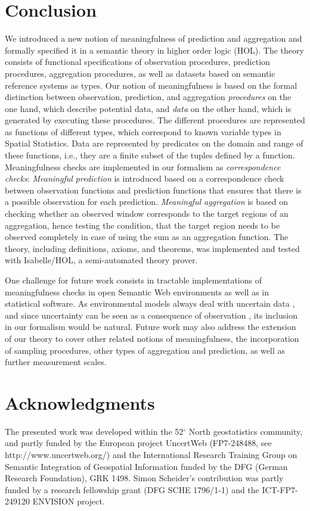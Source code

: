 \documentclass[final,authoryear,1p,times]{elsarticle}
\begin{document}
\section{Conclusion}\label{conclusions}

We introduced a new notion of meaningfulness of prediction and aggregation and formally specified it in a semantic theory in higher order logic (HOL). The theory consists of functional specifications of observation procedures, prediction procedures, aggregation procedures, as well as datasets based on semantic reference systems as types. Our notion of meaningfulness is based on the formal distinction between observation, prediction, and aggregation \textit{procedures} on the one hand, which describe potential data, and \textit{data} on the other hand, which is generated by executing these procedures. The different procedures are represented as functions of different types, which correspond to known variable types in Spatial Statistics. Data are represented by predicates on the domain and range of these functions, i.e., they are a finite subset of the tuples defined by a function. Meaningfulness checks are implemented in our formalism as \textit{correspondence checks}: \textit{Meaningful prediction} is introduced based on a correspondence check between observation functions and prediction functions that ensures that there is a possible observation for each prediction. \textit{Meaningful aggregation} is based on checking whether an observed window corresponds to the target regions of an aggregation, hence testing the condition, that the target region needs to be observed completely in case of using the sum as an aggregation function. The theory, including definitions, axioms, and theorems, was implemented and tested with Isabelle/HOL, a semi-automated theory prover.

One challenge for future work consists in tractable implementations of meaningfulness checks in open Semantic Web environments as well as in statistical software. As environmental models always deal with uncertain data \citep{Bastin2013}, and since uncertainty can be seen as a consequence of observation \citep{Frank2009}, its inclusion in our formalism would be natural. Future work may also address the extension of our theory to cover other related notions of meaningfulness, the incorporation of sampling procedures, other types of aggregation and prediction, as well as further measurement scales.

\section*{Acknowledgments}
The presented work was developed within the 52$^\circ$ North geostatistics community, and partly funded by the European project UncertWeb (FP7-248488, see http://www.uncertweb.org/) and the International Research Training Group on Semantic Integration of Geospatial Information funded by the DFG (German Research Foundation), GRK 1498.
Simon Scheider's contribution was partly funded by a research fellowship grant (DFG SCHE 1796/1-1) and the ICT-FP7-249120 ENVISION project.
\end{document}
